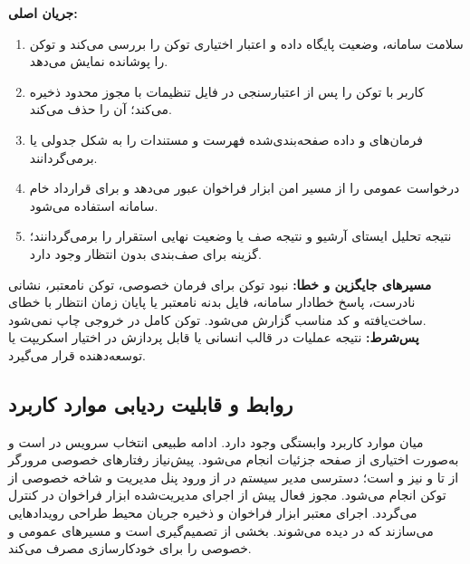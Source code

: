 
\noindent\textbf{جریان اصلی:}
\begin{enumerate}
  \item {} سلامت سامانه، وضعیت پایگاه داده و اعتبار اختیاری توکن را بررسی می‌کند و توکن را پوشانده نمایش می‌دهد.
  \item کاربر با  توکن را پس از اعتبارسنجی در فایل تنظیمات با مجوز محدود ذخیره می‌کند؛  آن را حذف می‌کند.
  \item فرمان‌های  و  داده صفحه‌بندی‌شده فهرست و مستندات را به شکل جدولی یا  برمی‌گردانند.
  \item {} درخواست عمومی را از مسیر امن ابزار فراخوان عبور می‌دهد و  برای قرارداد خام سامانه استفاده می‌شود.
  \item {} نتیجه تحلیل ایستای آرشیو و  نتیجه صف یا وضعیت نهایی استقرار را برمی‌گردانند؛ گزینه  برای صف‌بندی بدون انتظار وجود دارد.
\end{enumerate}

\noindent\textbf{مسیرهای جایگزین و خطا:}
نبود توکن برای فرمان خصوصی، توکن نامعتبر، نشانی نادرست، پاسخ خطادار سامانه، فایل بدنه نامعتبر یا پایان زمان انتظار با خطای ساخت‌یافته و کد مناسب گزارش می‌شود. توکن کامل در خروجی چاپ نمی‌شود.\\
\textbf{پس‌شرط:} نتیجه عملیات در قالب انسانی یا  قابل پردازش در اختیار اسکریپت یا توسعه‌دهنده قرار می‌گیرد.

\UseCaseStart
\subsection{روابط و قابلیت ردیابی موارد کاربرد}
میان موارد کاربرد وابستگی وجود دارد.  ادامه طبیعی انتخاب سرویس در  است و  به‌صورت اختیاری از صفحه جزئیات انجام می‌شود.  پیش‌نیاز رفتارهای خصوصی مرورگر از  تا  و نیز  و  است؛ دسترسی مدیر سیستم در  از ورود پنل مدیریت و شاخه خصوصی  از توکن انجام می‌شود. مجوز فعال پیش از اجرای مدیریت‌شده ابزار فراخوان در  کنترل می‌گردد. اجرای معتبر ابزار فراخوان و ذخیره جریان محیط طراحی رویدادهایی می‌سازند که در  دیده می‌شوند.  بخشی از تصمیم‌گیری  است و  مسیرهای عمومی و خصوصی را برای خودکارسازی مصرف می‌کند.

